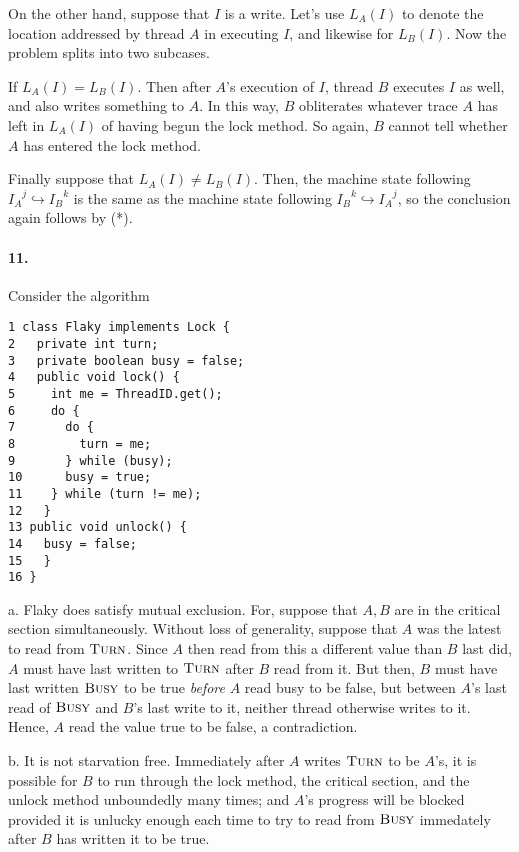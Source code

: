 On the other hand, suppose that $I$ is a write.  Let's use $L_A(I)$ to denote the location addressed by thread $A$ in executing $I$, and likewise for $L_B(I)$.  Now the problem splits into two subcases.

If $L_A(I)=L_B(I)$.  Then after $A$'s execution of $I$, thread $B$ executes $I$ as well, and also writes something to $A$.  In this way, $B$ obliterates whatever trace $A$ has left in $L_A(I)$ of having begun the lock method.  So again, $B$ cannot tell whether $A$ has entered the lock method.

Finally suppose that $L_A(I)\neq L_B(I)$.  Then, the machine state following ${I_A}^j\hookrightarrow {I_B}^k$ is the same as the machine state following ${I_B}^k\hookrightarrow {I_A}^j$, so the conclusion again follows by (*).

\paragraph{11.} Consider the algorithm

\begin{verbatim}
1 class Flaky implements Lock {
2   private int turn;
3   private boolean busy = false;
4   public void lock() {
5     int me = ThreadID.get();
6     do {
7       do {
8         turn = me;
9       } while (busy);
10      busy = true;
11    } while (turn != me);
12   }
13 public void unlock() {
14   busy = false;
15   }
16 }
\end{verbatim}

a. Flaky does satisfy mutual exclusion.  For, suppose that $A, B$ are in the critical section simultaneously.  Without loss of generality, suppose that $A$ was the latest to read from $\textsc{Turn}$.  Since $A$ then read from this a different value than $B$ last did, $A$ must have last written to $\textsc{Turn}$ after $B$ read from it.  But then, $B$ must have last written $\textsc{Busy}$ to be true \emph{before} $A$ read busy to be false, but between $A$'s last read of $\textsc{Busy}$ and $B$'s last write to it, neither thread otherwise writes to it.  Hence, $A$ read the value true to be false, a contradiction. 

b. It is not starvation free.  Immediately after $A$ writes $\textsc{Turn}$ to be $A$'s, it is possible for $B$ to run through the lock method, the critical section, and the unlock method unboundedly many times; and $A$'s progress will be blocked provided it is unlucky enough each time to try to read from $\textsc{Busy}$ immedately after $B$ has written it to be true.

